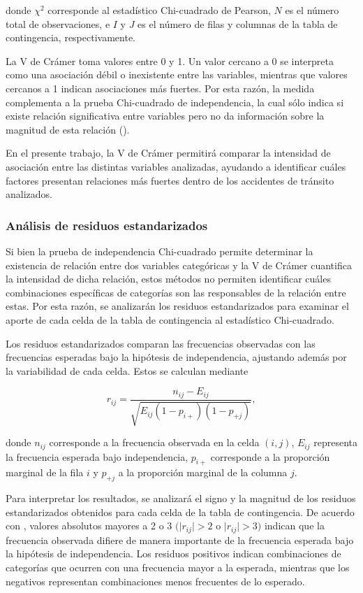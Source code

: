 \documentclass[12pt]{article}
\begin{document}
donde $\chi^2$ corresponde al estadístico Chi-cuadrado de Pearson, $N$ es el número total de observaciones, e $I$ y $J$
es el número de filas y columnas de la tabla de contingencia, respectivamente.

La V de Crámer toma valores entre 0 y 1. Un valor cercano a 0 se interpreta como una asociación débil o inexistente entre 
las variables, mientras que valores cercanos a 1 indican asociaciones más fuertes. Por esta razón, la medida complementa 
a la prueba Chi-cuadrado de independencia, la cual sólo indica si existe relación significativa entre variables pero no 
da información sobre la magnitud de esta relación (\cite{McHugh2013}).

En el presente trabajo, la V de Crámer permitirá comparar la intensidad de asociación entre las distintas variables analizadas, ayudando
a identificar cuáles factores presentan relaciones más fuertes dentro de los accidentes de tránsito analizados.

\subsubsection*{Análisis de residuos estandarizados}

Si bien la prueba de independencia Chi-cuadrado permite determinar la existencia de relación entre dos variables categóricas y la V de Crámer
cuantifica la intensidad de dicha relación, estos métodos no permiten identificar cuáles combinaciones específicas de categorías son las responsables
de la relación entre estas. Por esta razón, se analizarán los residuos estandarizados para examinar el aporte de cada celda de la tabla de contingencia 
al estadístico Chi-cuadrado.

Los residuos estandarizados comparan las frecuencias observadas con las frecuencias esperadas bajo la hipótesis de independencia, 
ajustando además por la variabilidad de cada celda. Estos se calculan mediante

$$
r_{ij}=
\frac{n_{ij}-E_{ij}}
{\sqrt{E_{ij}(1-p_{i+})(1-p_{+j})}},
$$

donde $n_{ij}$ corresponde a la frecuencia observada en la celda
$(i,j)$, $E_{ij}$ representa la frecuencia esperada bajo 
independencia, $p_{i+}$ corresponde a la proporción marginal de 
la fila $i$ y $p_{+j}$ a la proporción marginal de la columna $j$.

Para interpretar los resultados, se analizará el signo y la magnitud de los residuos estandarizados obtenidos para cada celda de la tabla de contingencia.
De acuerdo con \textcite{Agresti2002}, valores absolutos mayores a 2 o 3 $(\mid r_{ij}\mid>2$ o $\mid r_{ij}\mid>3)$ indican que la frecuencia observada
difiere de manera importante de la frecuencia esperada bajo la hipótesis de independencia. Los residuos positivos indican combinaciones de categorías que ocurren con una 
frecuencia mayor a la esperada, mientras que los negativos representan combinaciones menos frecuentes de lo esperado. 
\end{document}
